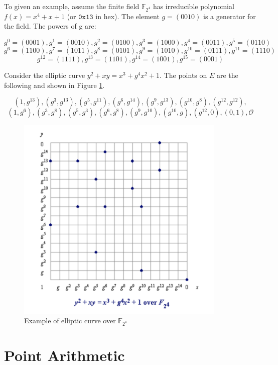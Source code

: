To given an example, assume the finite field $\mathbb{F}_{2^4}$ has irreducible polynomial $f(x)=x^4+x+1$ (or $\mathtt{0x13}$ in hex). The element $g = (0010)$ is a generator for the field. The powers of g are:
\begin{small}
$$g^0=(0001), g^1=(0010), g^2=(0100), g^3=(1000), g^4=(0011),g^5=(0110)$$
$$g^6=(1100), g^7=(1011), g^8=(0101), g^9=(1010), g^{10}=(0111),g^{11}=(1110)$$
$$g^{12}=(1111), g^{13}=(1101), g^{14}=(1001), g^{15}=(0001)$$
\end{small}
Consider the elliptic curve $y^2+xy=x^3+g^4x^2+1$. The points on $E$ are the following and shown in Figure \ref{fig:ecc_gf2m_example}.
\begin{small}
$$(1,g^{13}), (g^3,g^{13}) ,(g^5,g^{11}),(g^6,g^{14}),(g^9,g^{13}),(g^{10},g^8),(g^{12},g^{12}),$$
$$(1,g^6),(g^3,g^8),(g^5,g^3),(g^6,g^8),(g^9,g^{10}),(g^{10},g),(g^{12},0),(0,1), \mathcal{O}$$
\end{small}
    \begin{figure}[h!]
    	\centering
    	\includegraphics[width=100mm]{./pics/example_of_gf2m.png}
    	\caption[Example of elliptic curve over $\mathbb{F}_{2^4}$]{Example of elliptic curve over $\mathbb{F}_{2^4}$ \cite{ECCF2Pic}}
    	\label{fig:ecc_gf2m_example}
    \end{figure}
    
\section{Point Arithmetic}
